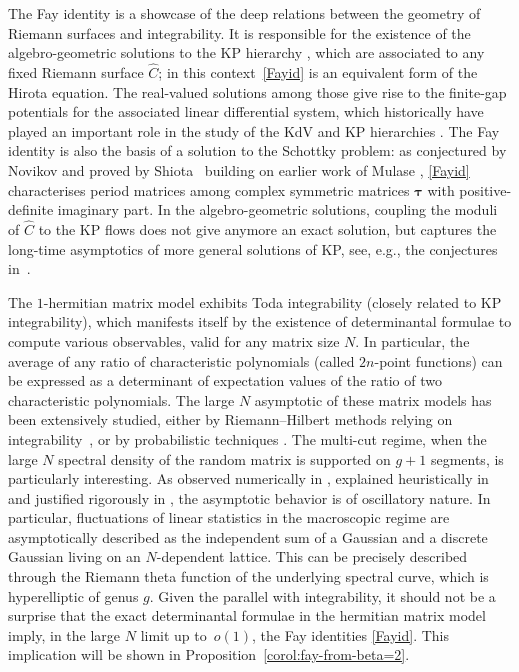 \documentclass[10pt,a4paper]{amsart}
\numberwithin{equation}{section}
\begin{document}
The Fay identity is a showcase of the deep relations between the
geometry of Riemann surfaces and integrability. It is responsible for
the existence of the algebro-geometric solutions to the KP hierarchy
\cite{Krichever}, which are associated to any fixed Riemann surface $\widehat{C}$; in
this context~\eqref{Fayid} is an equivalent form of the Hirota equation. The
real-valued solutions among those give rise to the finite-gap
potentials for the associated linear differential system, which
historically have played an important role in the study of the KdV and
KP hierarchies \cite{Matveev}. The Fay identity is also the basis of a solution
to the Schottky problem: as conjectured by Novikov and proved by
Shiota~\cite{Shiota} building on earlier work of Mulase \cite{Mulase}, \eqref{Fayid} characterises
period matrices among complex symmetric matrices $\bm{\tau}$ with
positive-definite imaginary part. In the algebro-geometric solutions,
coupling the moduli of $\widehat{C}$ to the KP flows does not give anymore
an exact solution, but captures the long-time asymptotics of more
general solutions of KP, see, e.g., the conjectures in~\cite{BEInt}.

The $1$-hermitian matrix model exhibits Toda integrability (closely related to KP integrability), which manifests itself by the existence of determinantal formulae to compute various observables, valid for any matrix size $N$. In particular, the average of any ratio of characteristic polynomials (called $2n$-point functions) can be expressed as a determinant of expectation values of the ratio of two characteristic polynomials. The large $N$ asymptotic of these matrix models has been extensively studied, either by Riemann--Hilbert methods relying on integrability~\mbox{\cite{CFWW,CGmL, Pastur06}}, or by probabilistic techniques \cite{APS01,BG11,BGmulti,BGK,Johan,Smulticut}. The multi-cut regime, when the large $N$ spectral density of the random matrix is supported on $g + 1$ segments, is particularly interesting. As observed numerically in \cite{Jur91}, explained heuristically in \cite{BDE} and justified rigorously in \cite{BGmulti,Smulticut}, the asymptotic behavior is of oscillatory nature. In particular, fluctuations of linear statistics in the macroscopic regime are asymptotically described as the independent sum of a Gaussian and a discrete Gaussian living on an $N$-dependent lattice. This can be precisely described through the Riemann theta function of the underlying spectral curve, which is hyperelliptic of genus $g$. Given the parallel with integrability, it should not be a surprise that the exact determinantal formulae in the hermitian matrix model imply, in the large $N$ limit up to~$o(1)$, the Fay identities \eqref{Fayid}. This implication will be shown in Proposition~\ref{corol:fay-from-beta=2}.
\end{document}

